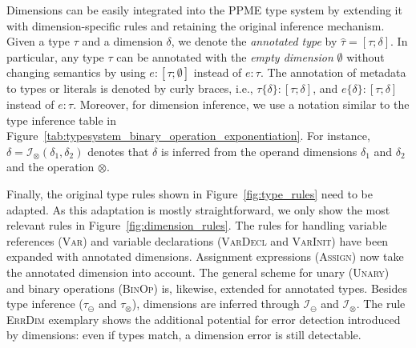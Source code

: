 

    Dimensions can be easily integrated into the PPME type system by extending it
    with dimension-specific rules and retaining the original inference mechanism.
%
Given a type $\tau$ and a dimension $\delta$, we denote the
\emph{annotated type} by $\hat{\tau} = [\tau; \delta]$. In particular, any type
$\tau$ can be annotated with the \emph{empty dimension} $\emptyset$ without
changing semantics by using $e : [\tau; \emptyset]$ instead of $e : \tau$. The annotation of
metadata to types or literals is denoted by curly braces, i.e., $\tau\{\delta\} :
[\tau; \delta]$, and $e\{\delta\} : [\tau;\delta]$ instead of $e : \tau$.
%
Moreover, for dimension inference, we use a notation similar to the
type inference table in Figure~\ref{tab:typesystem_binary_operation_exponentiation}.
For instance, $\delta =
\mathcal{I}_\otimes(\delta_1,\delta_2)$ denotes that $\delta$ is inferred from the
operand dimensions $\delta_1$ and $\delta_2$ and the operation $\otimes$.

Finally, the original type rules shown in Figure~\ref{fig:type_rules} need to be adapted.
As this adaptation is mostly straightforward, we only show the most relevant rules in
Figure~\ref{fig:dimension_rules}.
The rules for handling variable references
(\textsc{Var}) and variable declarations (\textsc{VarDecl} and \textsc{VarInit})
have been expanded with annotated dimensions.  Assignment expressions
(\textsc{Assign}) now take the annotated dimension into account.  The general
scheme for unary (\textsc{Unary}) and binary operations
(\textsc{BinOp}) is, likewise, extended for annotated types.
%
Besides type inference ($\tau_\ominus$ and $\tau_\otimes$), dimensions are inferred through
$\mathcal{I}_\ominus$ and $\mathcal{I}_\otimes$. The rule \textsc{ErrDim} exemplary
shows the additional potential for error detection introduced by dimensions: even if types match,
a dimension error is still detectable.


